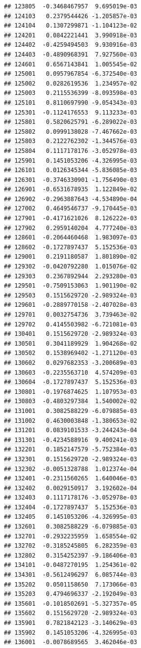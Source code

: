 \begin{frame}[fragile]
\begin{verbatim}
## 123805  -0.3468467957  9.695019e-03
## 124103   0.2379544426 -1.205857e-03
## 124104   0.1307299871 -1.104123e-02
## 124201   0.0842221441  3.990918e-03
## 124402  -0.4259494503  9.930916e-03
## 124403  -0.4890968391  7.927560e-03
## 124601   0.6567143841  1.005545e-02
## 125001   0.0957967854 -6.372540e-03
## 125002   0.0282619536  1.234957e-02
## 125003   0.2115536399 -8.093598e-03
## 125101   0.8110697990 -9.054343e-03
## 125301  -0.1124176553  9.113233e-03
## 125801   0.5820625791 -6.289022e-03
## 125802   0.0999138028 -7.467662e-03
## 125803   0.2122762302 -1.344576e-03
## 125804   0.1117178176 -3.052978e-03
## 125901   0.1451053206 -4.326995e-03
## 126101   0.0126345344 -5.836085e-03
## 126301  -0.3746330901 -1.756490e-03
## 126901  -0.6531678935  1.122849e-02
## 126902  -0.2963887643 -4.534890e-04
## 127002   0.4649546737 -9.170445e-03
## 127901  -0.4171621026  8.126222e-03
## 127902   0.2959140204  4.777240e-03
## 128601  -0.2064460468  1.983097e-03
## 128602  -0.1727897437  5.152536e-03
## 129001   0.2191180587  1.801890e-02
## 129302  -0.0420792280  1.015076e-02
## 129303   0.2367892944  2.293280e-03
## 129501  -0.7509153063  1.901190e-02
## 129503   0.1515629720 -2.989324e-03
## 129601  -0.2889770158 -2.407028e-03
## 129701   0.0032754736  3.739463e-02
## 129702   0.4145503982 -6.721081e-03
## 130401   0.1515629720 -2.989324e-03
## 130501   0.3041189929  1.904268e-02
## 130502   0.1538969402 -1.271120e-03
## 130602   0.0297682353 -3.200689e-03
## 130603  -0.2235563710  4.574209e-03
## 130604  -0.1727897437  5.152536e-03
## 130801  -0.1976874625  1.107953e-03
## 130803  -0.4803297384  1.540002e-02
## 131001   0.3082588229 -6.079885e-03
## 131002   0.4630003848 -1.380653e-02
## 131201   0.0839101533 -3.244243e-04
## 131301  -0.4234588916  9.400241e-03
## 132201   0.1852147579 -5.752384e-03
## 132301   0.1515629720 -2.989324e-03
## 132302  -0.0051328788  1.012374e-04
## 132401  -0.2311560265  1.640046e-03
## 132402   0.0029150917  3.192602e-04
## 132403   0.1117178176 -3.052978e-03
## 132404  -0.1727897437  5.152536e-03
## 132405   0.1451053206 -4.326995e-03
## 132601   0.3082588229 -6.079885e-03
## 132701  -0.2932235959  1.658554e-02
## 132702  -0.3185245805  6.282359e-03
## 132802   0.3154252397 -9.186406e-03
## 134101  -0.0487270195  1.254361e-02
## 134301  -0.5612496297  6.085744e-03
## 135202   0.0501158650  7.173066e-03
## 135203   0.4794696337 -2.192049e-03
## 135601  -0.1018502691 -5.327357e-05
## 135602   0.1515629720 -2.989324e-03
## 135901   0.7821842123 -3.140629e-03
## 135902   0.1451053206 -4.326995e-03
## 136001  -0.0078689565  3.462046e-03

\end{verbatim}
\end{frame}
